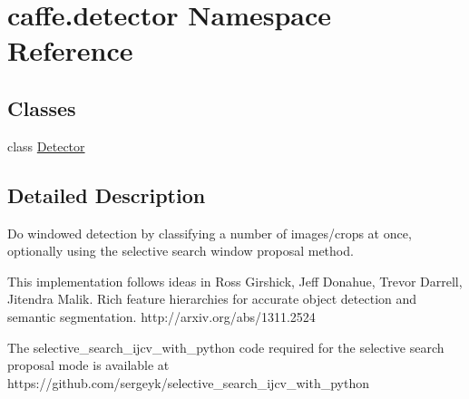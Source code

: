 \hypertarget{namespacecaffe_1_1detector}{}\section{caffe.\+detector Namespace Reference}
\label{namespacecaffe_1_1detector}
\subsection*{Classes}
\begin{DoxyCompactItemize}
\item 
class \mbox{\hyperlink{classcaffe_1_1detector_1_1_detector}{Detector}}
\end{DoxyCompactItemize}


\subsection{Detailed Description}
\begin{DoxyVerb}Do windowed detection by classifying a number of images/crops at once,
optionally using the selective search window proposal method.

This implementation follows ideas in
Ross Girshick, Jeff Donahue, Trevor Darrell, Jitendra Malik.
Rich feature hierarchies for accurate object detection and semantic
segmentation.
http://arxiv.org/abs/1311.2524

The selective_search_ijcv_with_python code required for the selective search
proposal mode is available at
https://github.com/sergeyk/selective_search_ijcv_with_python
\end{DoxyVerb}
 